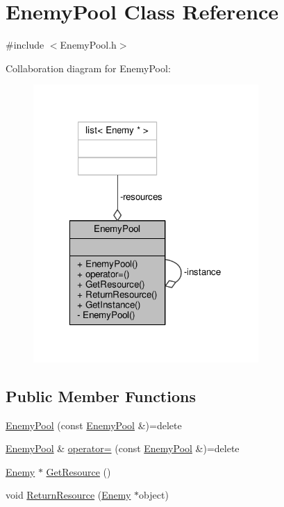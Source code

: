 \hypertarget{class_enemy_pool}{\section{Enemy\-Pool Class Reference}
\label{class_enemy_pool}
}


{\ttfamily \#include $<$Enemy\-Pool.\-h$>$}



Collaboration diagram for Enemy\-Pool\-:
\nopagebreak
\begin{figure}[H]
\begin{center}
\leavevmode
\includegraphics[width=243pt]{class_enemy_pool__coll__graph}
\end{center}
\end{figure}
\subsection*{Public Member Functions}
\begin{DoxyCompactItemize}
\item 
\hyperlink{class_enemy_pool_a7f7dfd08a6cb64c12c1f5842de977300}{Enemy\-Pool} (const \hyperlink{class_enemy_pool}{Enemy\-Pool} \&)=delete
\item 
\hyperlink{class_enemy_pool}{Enemy\-Pool} \& \hyperlink{class_enemy_pool_a9b652b5fdf0c284a4a6e6c51af66543c}{operator=} (const \hyperlink{class_enemy_pool}{Enemy\-Pool} \&)=delete
\item 
\hyperlink{class_enemy}{Enemy} $\ast$ \hyperlink{class_enemy_pool_ab2bf919b69de9b367aeeb231ad0b0b4e}{Get\-Resource} ()
\item 
void \hyperlink{class_enemy_pool_a23a38a606c719763861a882d9f5668e6}{Return\-Resource} (\hyperlink{class_enemy}{Enemy} $\ast$object)
\end{DoxyCompactItemize}
